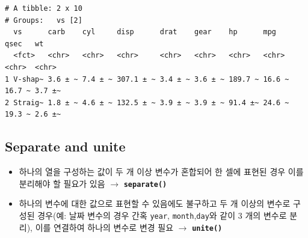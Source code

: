 \documentclass[
  11pt,
]{krantz}
\newenvironment{Shaded}{\begin{snugshade}}{\end{snugshade}}
\newcommand{\CommentTok}[1]{\textcolor[rgb]{0.37,0.37,0.37}{\textit{#1}}}
\newcommand{\DataTypeTok}[1]{\textcolor[rgb]{0.27,0.27,0.27}{#1}}
\newcommand{\KeywordTok}[1]{\textcolor[rgb]{0.27,0.27,0.27}{\textbf{#1}}}
\newcommand{\NormalTok}[1]{#1}
\newcommand{\OperatorTok}[1]{\textcolor[rgb]{0.43,0.43,0.43}{\textbf{#1}}}
\newcommand{\StringTok}[1]{\textcolor[rgb]{0.5,0.5,0.5}{#1}}
\providecommand{\tightlist}{%
  \setlength{\itemsep}{0pt}\setlength{\parskip}{0pt}}
\begin{document}
\begin{Shaded}
\end{Shaded}

\begin{verbatim}
# A tibble: 2 x 10
# Groups:   vs [2]
  vs      carb    cyl     disp      drat    gear    hp      mpg    qsec   wt    
  <fct>   <chr>   <chr>   <chr>     <chr>   <chr>   <chr>   <chr>  <chr>  <chr> 
1 V-shap~ 3.6 ± ~ 7.4 ± ~ 307.1 ± ~ 3.4 ± ~ 3.6 ± ~ 189.7 ~ 16.6 ~ 16.7 ~ 3.7 ±~
2 Straig~ 1.8 ± ~ 4.6 ± ~ 132.5 ± ~ 3.9 ± ~ 3.9 ± ~ 91.4 ±~ 24.6 ~ 19.3 ~ 2.6 ±~
\end{verbatim}

\normalsize

\hypertarget{separate-unite}{%
\subsection{Separate and unite}\label{separate-unite}}

\begin{itemize}
\tightlist
\item
  하나의 열을 구성하는 값이 두 개 이상 변수가 혼합되어 한 셀에 표현된 경우 이를 분리해야 할 필요가 있음 \(\rightarrow\) \textbf{\texttt{separate()}}
\item
  하나의 변수에 대한 값으로 표현할 수 있음에도 불구하고 두 개 이상의 변수로 구성된 경우(예: 날짜 변수의 경우 간혹 \texttt{year}, \texttt{month},\texttt{day}와 같이 3 개의 변수로 분리), 이를 연결하여 하나의 변수로 변경 필요 \(\rightarrow\) \textbf{\texttt{unite()}}
\end{itemize}
\end{document}
